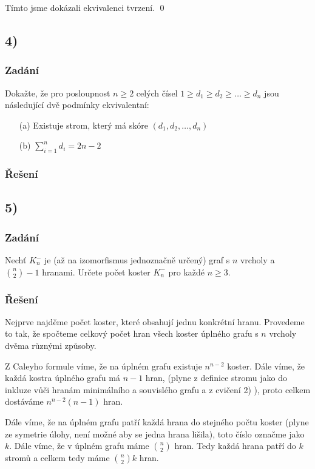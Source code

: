 \documentclass[../main.tex]{subfiles}
\begin{document}
Tímto jsme dokázali ekvivalenci tvrzení.
\qed

\subsection{4)}
\subsubsection*{Zadání}

Dokažte, že pro posloupnost $n\geq 2$ celých čísel 
$1\geq d_1\geq d_2 \geq \dots \geq d_n$ jsou následující
dvě podmínky ekvivalentní:
\begin{enumerate}
    \item[(a)] Existuje strom, který má skóre $(d_1, d_2, \dots, d_n)$
    \item[(b)] $\sum_{i=1}^n d_i = 2n - 2$
\end{enumerate}


\subsubsection*{Řešení}


\subsection{5)}
\subsubsection*{Zadání}

Nechť $K_n^-$ je (až na izomorfismus jednoznačně určený) graf s $n$ vrcholy a $\binom{n}{2} -1$ hranami.
Určete počet koster $K_n^-$ pro každé $n\geq 3$.

\subsubsection*{Řešení}


Nejprve najděme počet koster, které obsahují jednu konkrétní hranu. 
Provedeme to tak, že spočteme celkový počet hran všech koster úplného grafu s $n$ vrcholy dvěma různými způsoby. 

Z Caleyho formule víme, že na úplném grafu existuje $n^{n-2}$ koster. Dále víme, že každá kostra úplného grafu má $n-1$ hran, 
(plyne z definice stromu jako do inkluze vůči hranám minimálního a souvislého grafu a z cvičení 2) ), proto celkem dostáváme $n^{n-2}(n-1)$ hran.

Dále víme, že na úplném grafu patří každá hrana do stejného počtu koster 
(plyne ze symetrie úlohy, není možné aby se jedna hrana lišila), toto číslo označme
jako $k$. Dále víme, že v úplném grafu máme $\binom{n}{2}$ hran. Tedy každá hrana patří do $k$ stromů a celkem tedy máme $\binom{n}{2}k$ hran.
\end{document}
